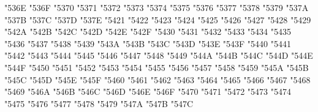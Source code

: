{\Uchar\jis"536E %
\Uchar\jis"536F %
\Uchar\jis"5370 %
\Uchar\jis"5371 %
\Uchar\jis"5372 %
\Uchar\jis"5373 %
\Uchar\jis"5374 %
\Uchar\jis"5375 %
\Uchar\jis"5376 %
\Uchar\jis"5377 %
\Uchar\jis"5378 %
\Uchar\jis"5379 %
\Uchar\jis"537A %
\Uchar\jis"537B %
\Uchar\jis"537C %
\Uchar\jis"537D %
\Uchar\jis"537E %
\Uchar\jis"5421 %
\Uchar\jis"5422 %
\Uchar\jis"5423 %
\Uchar\jis"5424 %
\Uchar\jis"5425 %
\Uchar\jis"5426 %
\Uchar\jis"5427 %
\Uchar\jis"5428 %
\Uchar\jis"5429 %
\Uchar\jis"542A %
\Uchar\jis"542B %
\Uchar\jis"542C %
\Uchar\jis"542D %
\Uchar\jis"542E %
\Uchar\jis"542F %
\Uchar\jis"5430 %
\Uchar\jis"5431 %
\Uchar\jis"5432 %
\Uchar\jis"5433 %
\Uchar\jis"5434 %
\Uchar\jis"5435 %
\Uchar\jis"5436 %
\Uchar\jis"5437 %
\Uchar\jis"5438 %
\Uchar\jis"5439 %
\Uchar\jis"543A %
\Uchar\jis"543B %
\Uchar\jis"543C %
\Uchar\jis"543D %
\Uchar\jis"543E %
\Uchar\jis"543F %
\Uchar\jis"5440 %
\Uchar\jis"5441 %
\Uchar\jis"5442 %
\Uchar\jis"5443 %
\Uchar\jis"5444 %
\Uchar\jis"5445 %
\Uchar\jis"5446 %
\Uchar\jis"5447 %
\Uchar\jis"5448 %
\Uchar\jis"5449 %
\Uchar\jis"544A %
\Uchar\jis"544B %
\Uchar\jis"544C %
\Uchar\jis"544D %
\Uchar\jis"544E %
\Uchar\jis"544F %
\Uchar\jis"5450 %
\Uchar\jis"5451 %
\Uchar\jis"5452 %
\Uchar\jis"5453 %
\Uchar\jis"5454 %
\Uchar\jis"5455 %
\Uchar\jis"5456 %
\Uchar\jis"5457 %
\Uchar\jis"5458 %
\Uchar\jis"5459 %
\Uchar\jis"545A %
\Uchar\jis"545B %
\Uchar\jis"545C %
\Uchar\jis"545D %
\Uchar\jis"545E %
\Uchar\jis"545F %
\Uchar\jis"5460 %
\Uchar\jis"5461 %
\Uchar\jis"5462 %
\Uchar\jis"5463 %
\Uchar\jis"5464 %
\Uchar\jis"5465 %
\Uchar\jis"5466 %
\Uchar\jis"5467 %
\Uchar\jis"5468 %
\Uchar\jis"5469 %
\Uchar\jis"546A %
\Uchar\jis"546B %
\Uchar\jis"546C %
\Uchar\jis"546D %
\Uchar\jis"546E %
\Uchar\jis"546F %
\Uchar\jis"5470 %
\Uchar\jis"5471 %
\Uchar\jis"5472 %
\Uchar\jis"5473 %
\Uchar\jis"5474 %
\Uchar\jis"5475 %
\Uchar\jis"5476 %
\Uchar\jis"5477 %
\Uchar\jis"5478 %
\Uchar\jis"5479 %
\Uchar\jis"547A %
\Uchar\jis"547B %
\Uchar\jis"547C %
}
